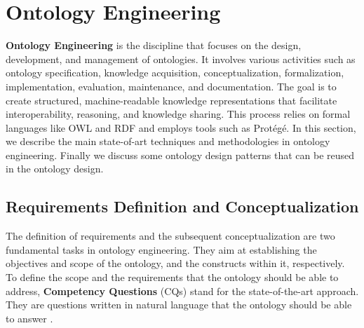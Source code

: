 \section{Ontology Engineering}
\label{section:2_2_ontology_engineering}

\textbf{Ontology Engineering} is the discipline that focuses on the design, development, and management of ontologies. It involves various activities such as ontology specification, knowledge acquisition, conceptualization, formalization, implementation, evaluation, maintenance, and documentation. The goal is to create structured, machine-readable knowledge representations that facilitate interoperability, reasoning, and knowledge sharing. This process relies on formal languages like OWL and RDF and employs tools such as Protégé.\cite{falquet2011introduction}
In this section, we describe the main state-of-art techniques and methodologies in ontology engineering. Finally we discuss some ontology design patterns that can be reused in the ontology design.
\subsection{Requirements Definition and Conceptualization}
The definition of requirements and the subsequent conceptualization are two fundamental tasks in ontology engineering.
They aim at establishing the objectives and scope of the ontology, and the constructs within it, respectively.
To define the scope and the requirements that the ontology should be able to address, \textbf{Competency Questions} (CQs) stand for the state-of-the-art approach.
They are questions written in natural language that the ontology should be able to answer \cite{malheiros2013method}.

